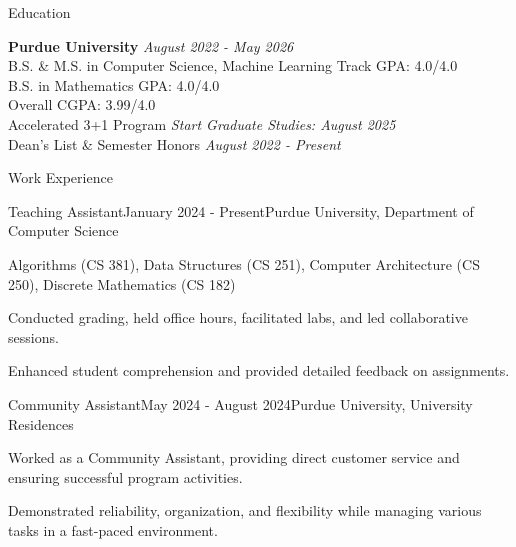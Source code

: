 \documentclass[
    11pt, %
]{resume} %
\begin{document}

\small
\begin{rSection}{Education}

    \textbf{Purdue University} \hfill \textit{August 2022 - May 2026} \\
    B.S. \& M.S. in Computer Science, Machine Learning Track \hfill GPA: 4.0/4.0 \\
    B.S. in Mathematics \hfill GPA: 4.0/4.0 \\
    \hspace*{\fill}  Overall CGPA: 3.99/4.0 \\
    Accelerated 3+1 Program \hfill {\em Start Graduate Studies: August 2025} \\
    Dean's List \& Semester Honors \hfill {\em August 2022 - Present}

\end{rSection}



\begin{rSection}{Work Experience}
    \begin{rSubsection}{Teaching Assistant}{January 2024 - Present}{Purdue University, Department of Computer Science}{}
        \item Algorithms (CS 381), Data Structures (CS 251), Computer Architecture (CS 250), Discrete Mathematics (CS 182)
        \item Conducted grading, held office hours, facilitated labs, and led collaborative sessions.
        \item Enhanced student comprehension and provided detailed feedback on assignments.
    \end{rSubsection}
    \vspace*{0,3cm}
    \begin{rSubsection}{Community Assistant}{May 2024 - August 2024}{Purdue University, University Residences}{}
      \item Worked as a Community Assistant, providing direct customer service and ensuring successful program activities. 
      \item Demonstrated reliability, organization, and flexibility while managing various tasks in a fast-paced environment.
    \end{rSubsection}
\end{rSection}
\end{document}
